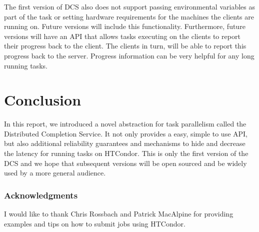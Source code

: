\documentclass{article}
\begin{document}
The first version of DCS also does not support passing environmental variables as part of the task or setting hardware requirements for the machines the clients are running on. Future versions will include this functionality. Furthermore, future versions will have an API that allows tasks executing on the clients to report their progress back to the client. The clients in turn, will be able to report this progress back to the server. Progress information can be very helpful for any long running tasks.

\section{Conclusion}

In this report, we introduced a novel abstraction for task parallelism called the Distributed Completion Service. It not only provides a easy, simple to use API, but also additional reliability guarantees and mechanisms to hide and decrease the latency for running tasks on HTCondor. This is only the first version of the DCS and we hope that subsequent versions will be open sourced and be widely used by a more general audience.

\subsubsection*{Acknowledgments}

I would like to thank Chris Rossbach and Patrick MacAlpine for providing examples and tips on how to submit jobs using HTCondor.



\end{document}
